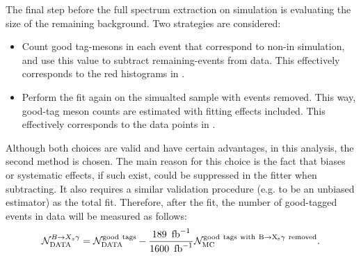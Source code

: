 The final step before the full \BtoXsgamma spectrum extraction on simulation is evaluating the size of the remaining \BB background.
Two strategies are considered:
\begin{itemize}
    \item Count good tag-\B mesons in each event that correspond to non-\BtoXsgamma in simulation, and use this value to subtract remaining-\BB events from data.
    This effectively corresponds to the red histograms in .
    \item Perform the fit again on the simualted sample with \BtoXsgamma events removed.
    This way, good-tag \B meson counts are estimated with fitting effects included.
    This effectively corresponds to the data points in .
\end{itemize}
Although both choices are valid and have certain advantages, in this analysis, the second method is chosen.
The main reason for this choice is the fact that biases or systematic effects, if such exist, could be suppressed in the fitter when subtracting.
It also requires a similar validation procedure (e.g. to be an unbiased estimator) as the total fit.
Therefore, after the \Mbc fit, the number of good-tagged \BtoXsgamma events in data will be measured as follows:
\begin{equation}\label{eq:background_subtraction}
    \mathcal{N}_{\mathrm{DATA}}^{\BtoXsgamma} = \mathcal{N}_{\mathrm{DATA}}^{\mathrm{good~tags}}  - \frac{189~\invfb}{1600~\invfb} \mathcal{N}_{\mathrm{MC}}^{\mathrm{good~tags~with~\BtoXsgamma~removed}}.
\end{equation}